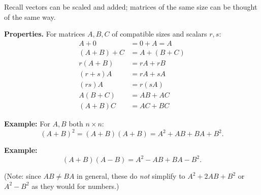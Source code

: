 \documentclass{article}
\begin{document}
\medskip

Recall vectors can be scaled and added; matrices of the same size can be thought of the same way.

\newpage

\textbf{Properties.} For matrices $A, B, C$ of compatible sizes and scalars $r, s$:
\begin{align*}
A + 0 &= 0 + A = A \\
(A+B)+C &= A+(B+C) \\
r(A+B) &= rA+rB \\
(r+s)A &= rA+sA \\
(rs)A &= r(sA) \\
A(B+C) &= AB+AC \\
(A+B)C &= AC+BC
\end{align*}

\bigskip

\textbf{Example:} For $A, B$ both $n \times n$:
\[
(A+B)^2 = (A+B)(A+B) = A^2 + AB + BA + B^2.
\]

\bigskip

\textbf{Example:}
\[
(A+B)(A-B) = A^2 - AB + BA - B^2.
\]

(Note: since $AB \neq BA$ in general, these do \emph{not} simplify to $A^2+2AB+B^2$ or $A^2-B^2$ as they would for numbers.)
\end{document}
